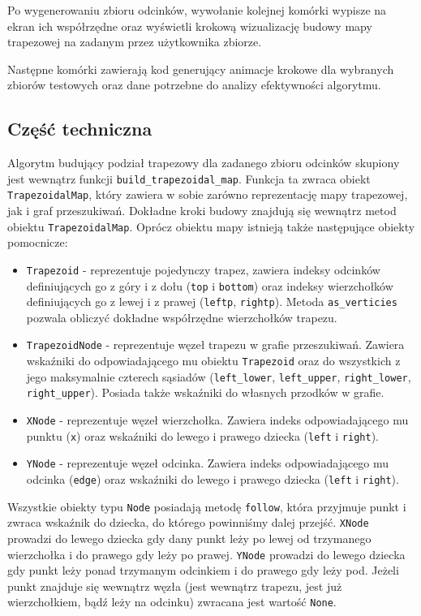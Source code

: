 \documentclass[11pt,a4paper]{article}
\begin{document}
Po wygenerowaniu zbioru odcinków, wywołanie kolejnej komórki
wypisze na ekran ich współrzędne oraz wyświetli krokową
wizualizację budowy mapy trapezowej na zadanym przez użytkownika
zbiorze.

Następne komórki zawierają kod generujący animacje krokowe
dla wybranych zbiorów testowych oraz dane potrzebne do
analizy efektywności algorytmu.

\subsection{Część techniczna}
Algorytm budujący podział trapezowy dla zadanego
zbioru odcinków skupiony jest wewnątrz funkcji
\verb|build_trapezoidal_map|. Funkcja ta zwraca
obiekt \verb|TrapezoidalMap|, który zawiera w sobie
zarówno reprezentację mapy trapezowej, jak 
i graf przeszukiwań. Dokładne kroki budowy 
znajdują się wewnątrz metod obiektu \verb|TrapezoidalMap|.
Oprócz obiektu mapy istnieją także następujące obiekty
pomocnicze:
\begin{itemize}
    \item \verb|Trapezoid| - reprezentuje pojedynczy trapez, 
    zawiera indeksy odcinków definiujących go z góry i z dołu 
    (\verb|top| i \verb|bottom|) oraz indeksy wierzchołków
    definiujących go z lewej i z prawej (\verb|leftp|, \verb|rightp|).
    Metoda \verb|as_verticies| pozwala obliczyć dokładne współrzędne
    wierzchołków trapezu.
    \item \verb|TrapezoidNode| - reprezentuje węzeł trapezu
    w grafie przeszukiwań. Zawiera wskaźniki do odpowiadającego
    mu obiektu \verb|Trapezoid| oraz do wszystkich z jego
    maksymalnie czterech sąsiadów (\verb|left_lower|, \verb|left_upper|, 
    \verb|right_lower|, \verb|right_upper|). Posiada także wskaźniki
    do własnych przodków w grafie.
    \item \verb|XNode| - reprezentuje węzeł wierzchołka. Zawiera
    indeks odpowiadającego mu punktu (\verb|x|) oraz
    wskaźniki do lewego i prawego dziecka (\verb|left| i \verb|right|).
    \item \verb|YNode| - reprezentuje węzeł odcinka. Zawiera
    indeks odpowiadającego mu odcinka (\verb|edge|) oraz
    wskaźniki do lewego i prawego dziecka (\verb|left| i \verb|right|).
\end{itemize}
Wszystkie obiekty typu \verb|Node| posiadają metodę \verb|follow|,
która przyjmuje punkt i zwraca wskaźnik do dziecka, do którego
powinniśmy dalej przejść. \verb|XNode| prowadzi do lewego
dziecka gdy dany punkt leży po lewej od trzymanego wierzchołka
i do prawego gdy leży po prawej. \verb|YNode| prowadzi do lewego
dziecka gdy punkt leży ponad trzymanym odcinkiem i do prawego
gdy leży pod. Jeżeli punkt znajduje się wewnątrz węzła
(jest wewnątrz trapezu, jest już wierzchołkiem, bądź leży na odcinku)
zwracana jest wartość \verb|None|.
\end{document}
